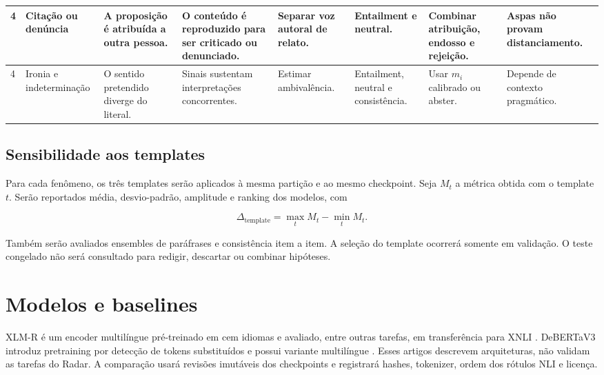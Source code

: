 \begin{table}[htbp]
\begin{tabular}{|p{}|p{}|p{}|p{}|p{}|p{}|p{}|p{}|}
\hline
4 & Citação ou denúncia & A proposição é atribuída a outra pessoa. & O conteúdo é reproduzido para ser criticado ou denunciado. & Separar voz autoral de relato. & Entailment e neutral. & Combinar atribuição, endosso e rejeição. & Aspas não provam distanciamento. \\
\hline
4 & Ironia e indeterminação & O sentido pretendido diverge do literal. & Sinais sustentam interpretações concorrentes. & Estimar ambivalência. & Entailment, neutral e consistência. & Usar \(m_i\) calibrado ou abster. & Depende de contexto pragmático. \\
\hline
\end{tabular}
\end{table}

\subsection{Sensibilidade aos templates}

Para cada fenômeno, os três templates serão aplicados à mesma partição e ao mesmo checkpoint. Seja \(M_t\) a métrica obtida com o template \(t\). Serão reportados média, desvio-padrão, amplitude e ranking dos modelos, com

\[
\Delta_{\mathrm{template}}=\max_t M_t-\min_t M_t.
\]

Também serão avaliados ensembles de paráfrases e consistência item a item. A seleção do template ocorrerá somente em validação. O teste congelado não será consultado para redigir, descartar ou combinar hipóteses.

\section{Modelos e baselines}
\label{sec:modelos-baselines}

XLM-R é um encoder multilíngue pré-treinado em cem idiomas e avaliado, entre outras tarefas, em transferência para XNLI \cite{conneau2020xlmr}. DeBERTaV3 introduz pretraining por detecção de tokens substituídos e possui variante multilíngue \cite{he2021debertav3}. Esses artigos descrevem arquiteturas, não validam as tarefas do Radar. A comparação usará revisões imutáveis dos checkpoints e registrará hashes, tokenizer, ordem dos rótulos NLI e licença.

